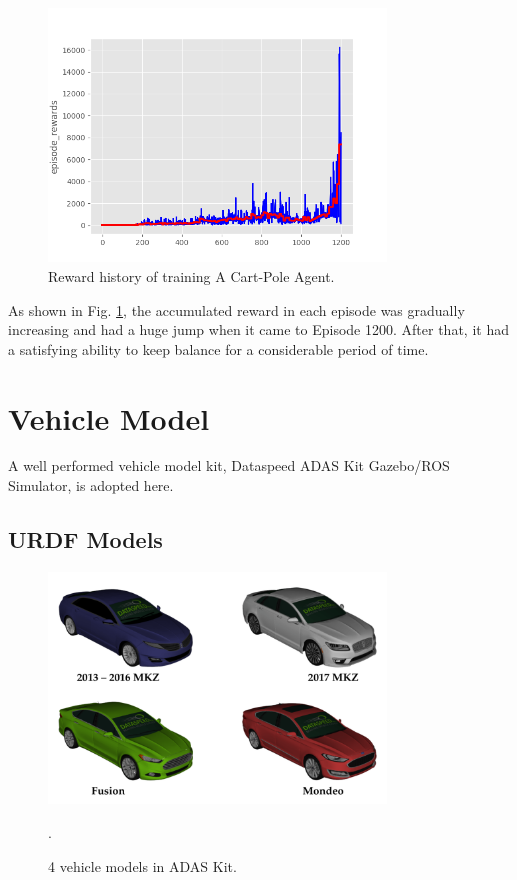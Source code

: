 \begin{figure}[h]
\centering
\includegraphics[width=0.8\textwidth]{figs/ch2/cartpole-epoch-1200}
\caption{Reward history of training A Cart-Pole Agent.}
\label{fig:cartpole-result}
\end{figure}

As shown in Fig. \ref{fig:cartpole-result}, the accumulated reward in each episode was gradually increasing and had a huge jump when it came to Episode 1200. After that, it had a satisfying ability to keep balance for a considerable period of time.

\section{Vehicle Model}

A well performed vehicle model kit, Dataspeed ADAS Kit Gazebo/ROS Simulator, is adopted here.

\subsection{URDF Models}

\begin{figure}[h]
\centering
\includegraphics[width=0.8\textwidth]{figs/ch2/mkz-cover}
\caption{4 vehicle models in ADAS Kit.}
\label{mkz-models}.
\end{figure}

